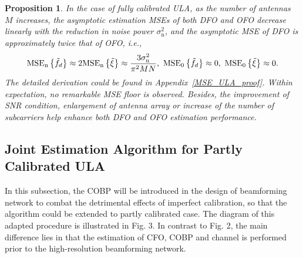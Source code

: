 \documentclass[12pt, draftclsnofoot, onecolumn]{IEEEtran}
\newtheorem{proposition}{Proposition}
\begin{document}
\begin{proposition}
In the case of fully calibrated ULA, as the number of antennas $M$ increases, the asymptotic estimation MSEs of both DFO and OFO decrease linearly with the reduction in noise power $\sigma_{\mathrm{n}}^2$, and the asymptotic MSE of DFO is approximately twice that of OFO, i.e.,
\begin{align}\label{MSE_ULA}
 {{\text{MSE}}_{\mathrm{n}}}\left\{ {{{\tilde{f}}}_{d}} \right\} \approx 2{{\text{MSE}}_{\mathrm{n}}}\left\{ {\tilde{\xi }} \right\} \approx \frac{3\sigma _{\mathrm{n}}^{2}}{{{ \rm{\pi} }^{2}}MN}, \ {{\text{MSE}}_{0}}\left\{ {{{\tilde{f}}}_{d}} \right\} \approx 0, \ {{\text{MSE}}_{0}}\left\{ {\tilde{\xi }} \right\} \approx 0.
\end{align}
The detailed derivation could be found in Appendix~\ref{MSE_ULA_proof}. Within expectation, no remarkable MSE floor is observed. Besides, the improvement of SNR condition, enlargement of antenna array or increase of the number of subcarriers help enhance both DFO and OFO estimation performance.
\end{proposition}


\vspace{-0.6em}
\subsection{Joint Estimation Algorithm for Partly Calibrated ULA}
In this subsection, the COBP will be introduced in the design of beamforming network to combat the detrimental effects of imperfect calibration, so that the algorithm could be extended to partly calibrated case.
The diagram of this adapted procedure is illustrated in Fig. 3.
In contrast to Fig. 2, the main difference lies in that the estimation of CFO, COBP and channel is performed prior to the high-resolution beamforming network.
\end{document}
